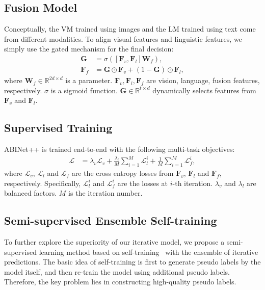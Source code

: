 \documentclass[10pt,journal,compsoc]{IEEEtran}
\begin{document}
\subsection{Fusion Model}
\label{sec:fusion}

Conceptually, the VM trained using images and the LM trained using text come from different modalities. To align visual features and linguistic features, we simply use the gated mechanism \cite{yu2020towards, yue2020robustscanner} for the final decision:
\begin{align}
\mathbf{G} &= \sigma([\mathbf{F}_{v}, \mathbf{F}_{l}] \mathbf{W}_f), \\
\mathbf{F}_{f} &= \mathbf{G} \odot \mathbf{F}_{v} + (1 - \mathbf{G}) \odot \mathbf{F}_{l},
\end{align}
where $\mathbf{W}_f \in \mathbb{R}^{2d \times d}$ is a parameter. $\mathbf{F}_{v}, \mathbf{F}_{l}, \mathbf{F}_{f}$ are vision, language, fusion features, respectively. $\sigma$ is a sigmoid function.  $\mathbf{G} \in \mathbb{R}^{t \times d}$ dynamically selects features from $\mathbf{F}_{v}$ and $\mathbf{F}_{l}$.


\subsection{Supervised Training}

ABINet++ is trained end-to-end with the following multi-task objectives:
\begin{align}
\mathcal{L} &= \lambda_v \mathcal{L}_v + \frac{\lambda_l}{M} \sum^M_{i=1}{\mathcal{L}^i_l} + \frac{1}{M} \sum^M_{i=1}{\mathcal{L}^i_f},
\label{eq:loss}
\end{align}
where $\mathcal{L}_v$, $\mathcal{L}_l$ and $\mathcal{L}_f$ are the cross entropy losses from $\mathbf{F}_{v}$, $\mathbf{F}_{l}$ and $\mathbf{F}_{f}$, respectively. Specifically, $\mathcal{L}^i_{l}$ and $\mathcal{L}^i_{f}$ are the losses at $i$-th iteration. $\lambda_v$ and $\lambda_l$ are balanced factors. $M$ is the iteration number.



\subsection{Semi-supervised Ensemble Self-training}
\label{sec:semi-supervised}

To further explore the superiority of our iterative model, we propose a semi-supervised learning method based on self-training~\cite{xie2020self} with the ensemble of iterative predictions. The basic idea of self-training is first to generate pseudo labels by the model itself, and then re-train the model using additional pseudo labels. Therefore, the key problem lies in constructing high-quality pseudo labels.
\end{document}

